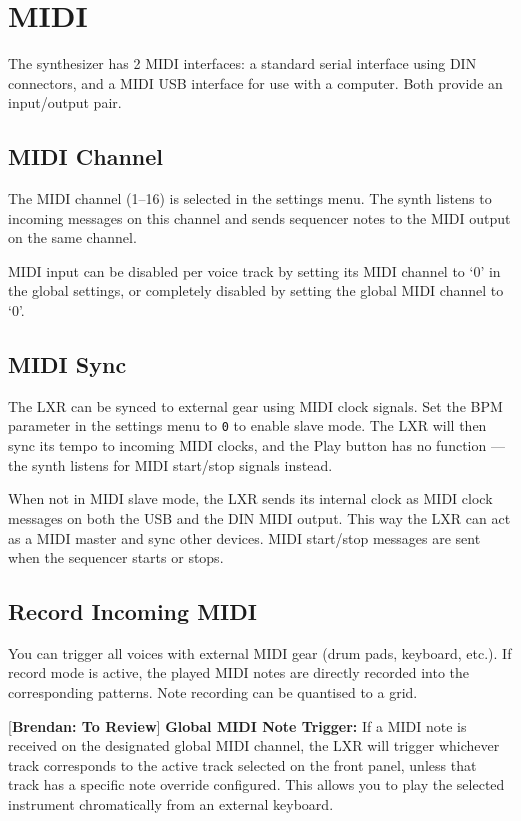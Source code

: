 \section{MIDI}\label{midi}

The synthesizer has 2 MIDI interfaces: a standard serial interface using
DIN connectors, and a MIDI USB interface for use with a computer. Both
provide an input/output pair.

\subsection{MIDI Channel}\label{midi-channel}

The MIDI channel (1--16) is selected in the settings menu. The synth
listens to incoming messages on this channel and sends sequencer notes
to the MIDI output on the same channel.

MIDI input can be disabled per voice track by setting its MIDI channel
to `0' in the global settings, or completely disabled by setting the
global MIDI channel to `0'.

\subsection{MIDI Sync}\label{midi-sync}

The LXR can be synced to external gear using MIDI clock signals. Set the
BPM parameter in the settings menu to \texttt{0} to enable slave mode.
The LXR will then sync its tempo to incoming MIDI clocks, and the Play
button has no function --- the synth listens for MIDI start/stop signals
instead.

When not in MIDI slave mode, the LXR sends its internal clock as MIDI
clock messages on both the USB and the DIN MIDI output. This way the LXR
can act as a MIDI master and sync other devices. MIDI start/stop
messages are sent when the sequencer starts or stops.

\subsection{Record Incoming MIDI}\label{record-incoming-midi}

You can trigger all voices with external MIDI gear (drum pads, keyboard,
etc.). If record mode is active, the played MIDI notes are directly
recorded into the corresponding patterns. Note recording can be
quantised to a grid.

{[}\textbf{Brendan: To Review}{]} \textbf{Global MIDI Note Trigger:} If
a MIDI note is received on the designated global MIDI channel, the LXR
will trigger whichever track corresponds to the active track selected on
the front panel, unless that track has a specific note override
configured. This allows you to play the selected instrument
chromatically from an external keyboard.

